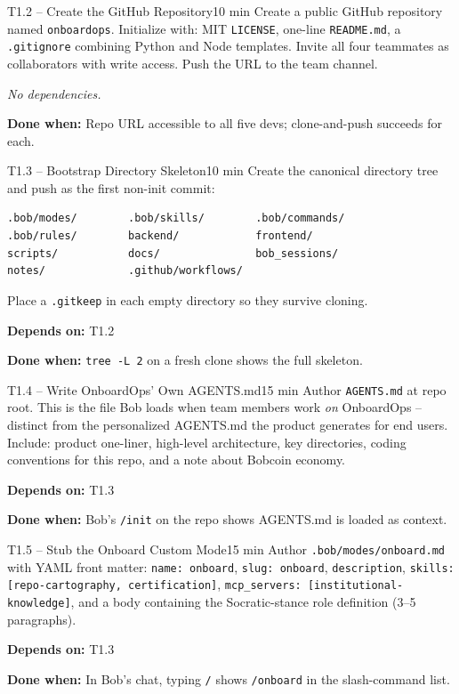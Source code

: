\documentclass[11pt,letterpaper]{article}
\newcommand{\acceptance}[1]{\par\smallskip\textcolor{ibmgreen}{\textbf{Done when:}} #1}
\newcommand{\depends}[1]{\par\smallskip\textcolor{ibmorange}{\textbf{Depends on:}} #1}
\newcommand{\nodep}{\par\smallskip\textcolor{ibmgray}{\textit{No dependencies.}}}
\begin{document}
\begin{task}{T1.2 -- Create the GitHub Repository}{10 min}
Create a public GitHub repository named \texttt{onboardops}. Initialize with: MIT \texttt{LICENSE}, one-line \texttt{README.md}, a \texttt{.gitignore} combining Python and Node templates. Invite all four teammates as collaborators with write access. Push the URL to the team channel.
\nodep
\acceptance{Repo URL accessible to all five devs; clone-and-push succeeds for each.}
\end{task}

\begin{task}{T1.3 -- Bootstrap Directory Skeleton}{10 min}
Create the canonical directory tree and push as the first non-init commit:

\begin{lstlisting}
.bob/modes/        .bob/skills/        .bob/commands/
.bob/rules/        backend/            frontend/
scripts/           docs/               bob_sessions/
notes/             .github/workflows/
\end{lstlisting}

Place a \texttt{.gitkeep} in each empty directory so they survive cloning.
\depends{T1.2}
\acceptance{\texttt{tree -L 2} on a fresh clone shows the full skeleton.}
\end{task}

\begin{task}{T1.4 -- Write OnboardOps' Own AGENTS.md}{15 min}
Author \texttt{AGENTS.md} at repo root. This is the file Bob loads when team members work \textit{on} OnboardOps -- distinct from the personalized AGENTS.md the product generates for end users. Include: product one-liner, high-level architecture, key directories, coding conventions for this repo, and a note about Bobcoin economy.
\depends{T1.3}
\acceptance{Bob's \texttt{/init} on the repo shows AGENTS.md is loaded as context.}
\end{task}

\begin{task}{T1.5 -- Stub the Onboard Custom Mode}{15 min}
Author \texttt{.bob/modes/onboard.md} with YAML front matter: \texttt{name: onboard}, \texttt{slug: onboard}, \texttt{description}, \texttt{skills: [repo-cartography, certification]}, \texttt{mcp\_servers: [institutional-knowledge]}, and a body containing the Socratic-stance role definition (3--5 paragraphs).
\depends{T1.3}
\acceptance{In Bob's chat, typing \texttt{/} shows \texttt{/onboard} in the slash-command list.}
\end{task}
\end{document}
